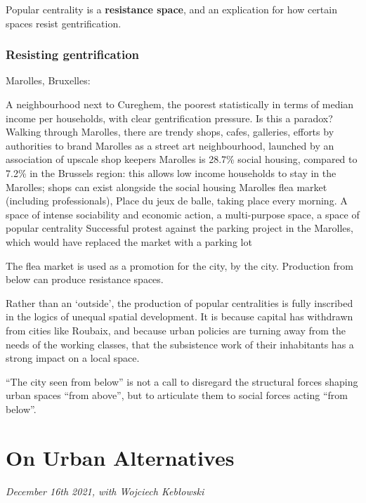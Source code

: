 \documentclass{article}
\begin{document}
Popular centrality is a \textbf{resistance space}, and an explication for how certain spaces resist gentrification.

\subsubsection{Resisting gentrification}

Marolles, Bruxelles: 

\begin{outline}
	\1 A neighbourhood next to Cureghem, the poorest statistically in terms of median income per households, with clear gentrification pressure. Is this a paradox? Walking through Marolles, there are trendy shops, cafes, galleries, efforts by authorities to brand Marolles as a street art neighbourhood, launched by an association of upscale shop keepers
	\1 Marolles is 28.7\% social housing, compared to 7.2\% in the Brussels region: this allows low income households to stay in the Marolles; shops can exist alongside the social housing
	\1 Marolles flea market (including professionals), Place du jeux de balle, taking place every morning. A space of intense sociability and economic action, a multi-purpose space, a space of popular centrality
	\1 Successful protest against the parking project in the Marolles, which would have replaced the market with a parking lot
\end{outline}

The flea market is used as a promotion for the city, by the city. Production from below can produce resistance spaces.

Rather than an `outside', the production of popular centralities is fully inscribed in the logics of unequal spatial development. It is because capital has withdrawn from cities like Roubaix, and because urban policies are turning away from the needs of the working classes, that the subsistence work of their inhabitants has a strong impact on a local space.

``The city seen from below'' is not a call to disregard the structural forces shaping urban spaces ``from above'', but to articulate them to social forces acting ``from below''.


\section{On Urban Alternatives}
\textit{December 16th 2021, with Wojciech Kebłowski}
\end{document}
